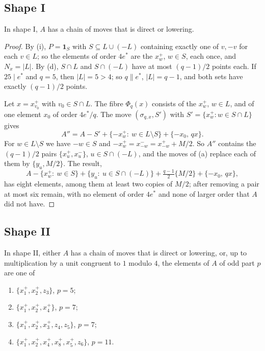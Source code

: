 \subsection{Shape I}

\begin{lemma}\label{lem:shapeI}
In shape \textup{I}, $A$ has a chain of moves that is direct or lowering.
\end{lemma}

\begin{proof}
By (i), $P=\mathbf 1_{S}$ with $S\subseteq L\cup(-L)$
containing exactly one of $v,-v$ for each $v\in L$; so the elements of order
$4e^{*}$ are the $x^{+}_{w}$, $w\in S$, each once, and $N_{x}=|L|$. By
(d), $S\cap L$ and $S\cap(-L)$ have at most $(q-1)/2$
points each. If $25\mid e^{*}$ and $q=5$, then $|L|=5>4$; so $q\parallel e^{*}$,
$|L|=q-1$, and both sets have exactly $(q-1)/2$ points.

Let $x=x^{+}_{v_{0}}$ with $v_{0}\in S\cap L$. The fibre $\Phi_{q}(x)$
consists of the $x^{+}_{w}$, $w\in L$, and of one element $x_{0}$ of order
$4e^{*}/q$. The move $(\sigma_{q,x},S')$ with $S'=\{x^{+}_{w}:w\in S\cap L\}$
gives
\[
  A''=A-S'+\{-x^{+}_{w}:\ w\in L\setminus S\}+\{-x_{0},\,qx\}.
\]
For $w\in L\setminus S$ we have $-w\in S$ and $-x^{+}_{w}=x^{-}_{-w}=
x^{+}_{-w}+M/2$. So $A''$ contains the $(q-1)/2$ pairs $\{x^{+}_{u},x^{-}_{u}\}$,
$u\in S\cap(-L)$, and the moves of (a) replace each of them
by $\{y_{u},M/2\}$. The result,
\[
  A-\{x^{+}_{w}:\ w\in S\}+\{y_{u}:\ u\in S\cap(-L)\}+\tfrac{q-1}{2}\{M/2\}
  +\{-x_{0},\,qx\},
\]
has eight elements, among them at least two copies of $M/2$; after removing a
pair at most six remain, with no element of order $4e^{*}$ and none of larger
order that $A$ did not have.
\end{proof}

\subsection{Shape II}

\begin{lemma}\label{lem:shapeII}
In shape \textup{II}, either $A$ has a chain of moves that is direct or
lowering, or, up to multiplication by a unit congruent to $1$ modulo $4$, the
elements of $A$ of odd part $p$ are one of
\begin{enumerate}[label=\textup{(\alph*)}]
\item $\{x^{+}_{1},x^{+}_{2},z_{3}\}$, $p=5$;
\item $\{x^{+}_{1},x^{+}_{2},x^{+}_{4}\}$, $p=7$;
\item $\{x^{+}_{1},x^{+}_{2},x^{+}_{3},z_{4},z_{5}\}$, $p=7$;
\item $\{x^{+}_{1},x^{+}_{2},x^{+}_{4},x^{+}_{8},x^{+}_{5},z_{6}\}$, $p=11$.
\end{enumerate}
\end{lemma}

